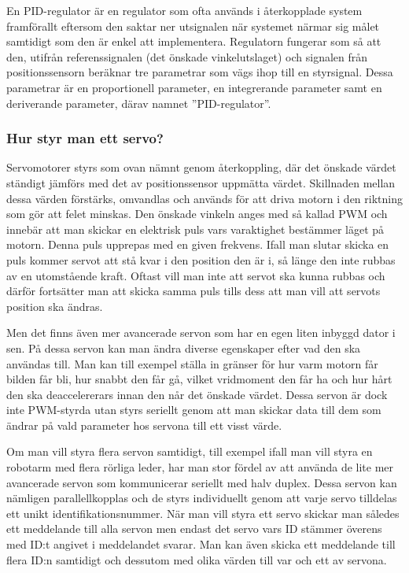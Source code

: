 \documentclass[a4paper,12pt]{article}
\begin{document}
En PID-regulator är en regulator som ofta används i återkopplade system framförallt eftersom den saktar ner utsignalen när systemet närmar sig målet samtidigt som den är enkel att implementera. Regulatorn fungerar som så att den, utifrån referenssignalen (det önskade vinkelutslaget) och signalen från positionssensorn beräknar tre parametrar som vägs ihop till en styrsignal. Dessa parametrar är en proportionell parameter, en integrerande parameter samt en deriverande parameter, därav namnet ”PID-regulator”. 
 
 
 
\subsubsection{Hur styr man ett servo?}
 
Servomotorer styrs som ovan nämnt genom återkoppling, där det önskade värdet ständigt  jämförs med det av positionssensor uppmätta värdet. Skillnaden mellan dessa värden förstärks, omvandlas och används för att driva motorn i den riktning som gör att felet minskas. Den önskade vinkeln anges med så kallad PWM och innebär att man skickar en elektrisk puls vars varaktighet bestämmer läget på motorn. Denna puls upprepas med en given frekvens. Ifall man slutar skicka en puls kommer servot att stå kvar i den position den är i, så länge den inte rubbas av en utomstående kraft. Oftast vill man inte att servot ska kunna rubbas och därför fortsätter man att skicka samma puls tills dess att man vill att servots position ska ändras. 
 
Men det finns även mer avancerade servon som har en egen liten inbyggd dator i sen. På dessa servon kan man ändra diverse egenskaper efter vad den ska användas till. Man kan till exempel ställa in gränser för hur varm motorn får bilden får bli, hur snabbt den får gå, vilket vridmoment den får ha och hur hårt den ska deaccelererars innan den når det önskade värdet. Dessa servon är dock inte PWM-styrda utan styrs seriellt genom att man skickar data till dem som ändrar på vald parameter hos servona till ett visst värde. 
 
Om man vill styra flera servon samtidigt, till exempel ifall man vill styra en robotarm med flera rörliga leder, har man stor fördel av att använda de lite mer avancerade servon som kommunicerar seriellt med halv duplex. Dessa servon kan nämligen parallellkopplas och de styrs individuellt genom att varje servo tilldelas ett unikt identifikationsnummer. När man vill styra ett servo skickar man således ett meddelande till alla servon men endast det servo vars ID stämmer överens med ID:t angivet i meddelandet svarar. Man kan även skicka ett meddelande till flera ID:n samtidigt och dessutom med olika värden till var och ett av servona. 
 
\end{document}
